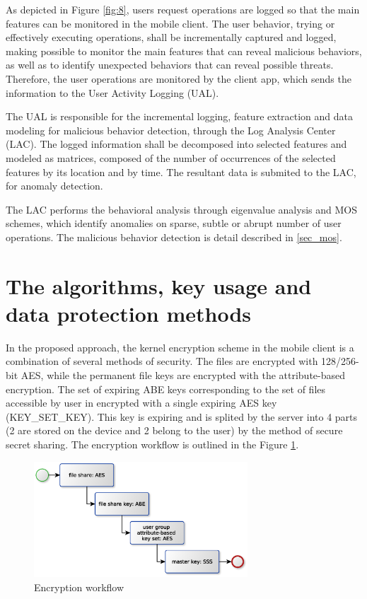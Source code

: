 \documentclass[twocolumn]{svjour3}          	%
\begin{document}
As depicted in Figure \ref{fig:8}, users request operations are logged so that the main features can be monitored in the mobile client. The user behavior, trying or effectively executing operations, shall be incrementally captured and logged, making possible to monitor the main features that can reveal malicious behaviors, as well as to identify unexpected behaviors that can reveal possible threats. Therefore, the user operations are monitored by the client app, which sends the information to the User Activity Logging (UAL). 

The UAL is responsible for the incremental logging, feature extraction and data modeling for malicious behavior detection, through the Log Analysis Center (LAC). The logged information shall be decomposed into selected features and modeled as matrices, composed of the number of occurrences of the selected features by its location and by time. The resultant data is submited to the LAC, for anomaly detection.

The LAC performs the behavioral analysis through eigenvalue analysis and MOS schemes, which identify anomalies on sparse, subtle or abrupt number of user operations. The malicious behavior detection is detail described in \ref{sec_mos}.

\section{The algorithms, key usage and data protection methods}
\label{sec_algorithms}
In the proposed approach, the kernel encryption scheme in the mobile client is a combination of several methods of security. The files are encrypted with 128/256-bit AES, while the permanent file keys are encrypted with the attribute-based encryption. The set of expiring ABE keys corresponding to the set of files accessible by user in encrypted with a single expiring AES key (KEY\_SET\_KEY). This key is expiring and is splited by the server into 4 parts (2 are stored on the device and 2 belong to the user) by the method of secure secret sharing. The encryption workflow is outlined in the Figure \ref{fig:9}.

\begin{figure}[h!]
	\centering
	\includegraphics[width=8cm]{figures/encryptionworkflow.eps}
	\caption{Encryption workflow}
	\label{fig:9}
\end{figure}
\end{document}
